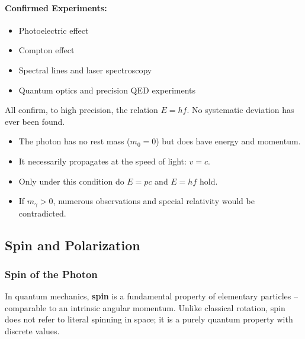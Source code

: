 \paragraph*{Confirmed Experiments:}
\begin{itemize}
	\item Photoelectric effect
	\item Compton effect
	\item Spectral lines and laser spectroscopy
	\item Quantum optics and precision QED experiments
\end{itemize}
All confirm, to high precision, the relation $E = hf$. No systematic deviation has ever been found.
\vspace{1em}
\begin{tcolorbox}[physikbox, title=Conclusion: Why the Photon Is Massless]
	\label{box:Warum das Photon}
	\begin{itemize}
		\item The photon has no rest mass ($m_0 = 0$) but does have energy and momentum.
		\item It necessarily propagates at the speed of light: $v = c$.
		\item Only under this condition do $E = pc$ and $E = hf$ hold.
		\item If $m_\gamma > 0$, numerous observations and special relativity would be contradicted.
	\end{itemize}
\end{tcolorbox}
\vspace{1em}

\newpage
\noindent
\subsection{Spin and Polarization}

\subsubsection{Spin of the Photon}

In quantum mechanics, \textbf{spin} is a fundamental property of elementary particles – comparable to an intrinsic angular momentum. Unlike classical rotation, spin does not refer to literal spinning in space; it is a purely quantum property with discrete values.

